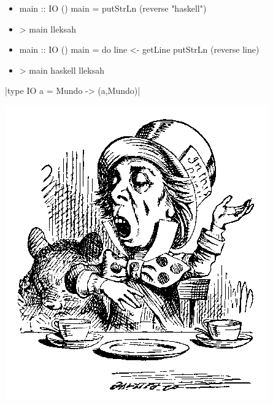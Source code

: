 \documentclass[spanish]{beamer}
\begin{document}
\begin{frame}[fragile]
  \begin{itemize}
  \item
    \begin{code}
main :: IO ()
main = putStrLn (reverse "haskell")
    \end{code}
  \item
    \begin{code}
> main
lleksah
    \end{code}
  \end{itemize}
\end{frame}


\begin{frame}[fragile]
  \begin{itemize}
  \item
    \begin{code}
main :: IO ()
main = do
  line <- getLine
  putStrLn (reverse line)
    \end{code}
  \item
    \begin{code}
> main
haskell
lleksah
    \end{code}
  \end{itemize}
\end{frame}


\begin{frame}[fragile]
  \begin{center}
    |type IO a = Mundo -> (a,Mundo)|
  \end{center}
  \begin{center}
    \includegraphics[scale=0.3]{hatter}
  \end{center}
\end{frame}
\end{document}
